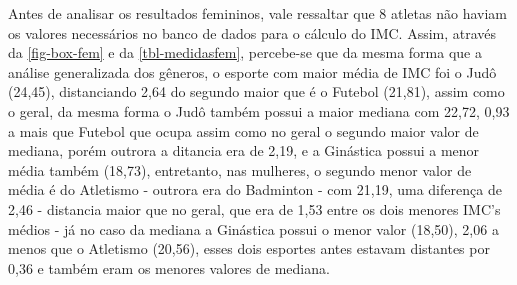 \documentclass[
]{estat/estat}
\begin{document}
\begin{table}[H]

\caption{\label{tbl-medidasfem}Medidas resumo do IMC das atletas
femininas dos esportes de interesse}


\end{table}%

Antes de analisar os resultados femininos, vale ressaltar que 8 atletas
não haviam os valores necessários no banco de dados para o cálculo do
IMC. Assim, através da \ref{fig-box-fem} e da \ref{tbl-medidasfem},
percebe-se que da mesma forma que a análise generalizada dos gêneros, o
esporte com maior média de IMC foi o Judô (24,45), distanciando 2,64 do
segundo maior que é o Futebol (21,81), assim como o geral, da mesma
forma o Judô também possui a maior mediana com 22,72, 0,93 a mais que
Futebol que ocupa assim como no geral o segundo maior valor de mediana,
porém outrora a ditancia era de 2,19, e a Ginástica possui a menor média
também (18,73), entretanto, nas mulheres, o segundo menor valor de média
é do Atletismo - outrora era do Badminton - com 21,19, uma diferença de
2,46 - distancia maior que no geral, que era de 1,53 entre os dois
menores IMC's médios - já no caso da mediana a Ginástica possui o menor
valor (18,50), 2,06 a menos que o Atletismo (20,56), esses dois esportes
antes estavam distantes por 0,36 e também eram os menores valores de
mediana.
\end{document}
